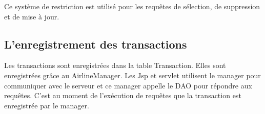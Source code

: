 Ce système de restriction est utilisé pour les requêtes de sélection, de suppression et de mise à jour.
\subsection{L'enregistrement des transactions}
Les transactions sont enregistrées dans la table Transaction. Elles sont enregistrées grâce au AirlineManager. Les Jsp et servlet utilisent le manager pour communiquer avec le serveur et ce manager appelle le DAO pour répondre aux requêtes. C'est au moment de l'exécution de requêtes que la transaction est enregistrée par le manager.